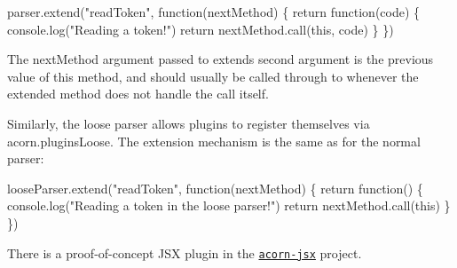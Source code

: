 \begin{DoxyCode}
parser.extend("readToken", function(nextMethod) \{
  return function(code) \{
    console.log("Reading a token!")
    return nextMethod.call(this, code)
  \}
\})
\end{DoxyCode}


The {\ttfamily next\+Method} argument passed to {\ttfamily extend}\textquotesingle{}s second argument is the previous value of this method, and should usually be called through to whenever the extended method does not handle the call itself.

Similarly, the loose parser allows plugins to register themselves via {\ttfamily acorn.\+plugins\+Loose}. The extension mechanism is the same as for the normal parser\+:


\begin{DoxyCode}
looseParser.extend("readToken", function(nextMethod) \{
  return function() \{
    console.log("Reading a token in the loose parser!")
    return nextMethod.call(this)
  \}
\})
\end{DoxyCode}


There is a proof-\/of-\/concept J\+SX plugin in the \href{https://github.com/RReverser/acorn-jsx}{\tt {\ttfamily acorn-\/jsx}} project. 